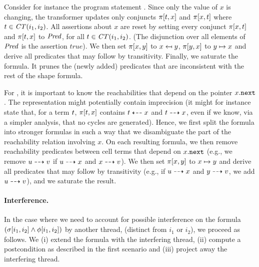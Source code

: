 Consider for instance the program statement {}. %
Since only the value of $x$ is changing, the transformer updates only
conjuncts $\pi[t,x]$ and $\pi[x,t]$ where
$t\in{\it CT}(i_1,i_2)$. %
All assertions about $x$ are reset by setting every conjunct
$\pi[x,t]$ and $\pi[t,x]$ to $\mathit{Pred}$, for all
$t\in{\it CT}(i_1,i_2)$. %
(The disjunction over all elements of $\mathit{Pred}$ is the assertion
$true$). %
We then set $\pi[x,y]$ to $x\mapsfrom y$, $\pi[y,x]$ to
$y\mapsto x$ and derive all predicates that may follow by
transitivity. %
Finally, we saturate the formula. It prunes the (newly added)
predicates that are inconsistent with the rest of the shape formula.

For {}, it is important to know the reachabilities
that depend on the pointer $x{\tt .next}$. %
The representation might potentially contain imprecision %
(it might for instance state that, for a term $t$,
$\pi[t,x]$ contains $t\dashleftarrow x$ and $t\dashrightarrow x$, %
even if we know, via a simpler analysis, that no cycles are generated). %
Hence, we first split the formula into stronger formulas in such a way
that we disambiguate the part of the reachability relation involving
$x$. %
%
On each resulting formula, we then remove reachability predicates
between cell terms that depend on $x{\tt .next}$ %
(e.g., we remove $u\dashrightarrow v$ if $u\dashrightarrow x$ and $x\dashrightarrow v$). %
We then set $\pi[x,y]$ to $x\mapsto y$ and derive all
predicates that may follow by transitivity (e.g., if $u\dashrightarrow x$ and
$y\dashrightarrow v$, we add $u\dashrightarrow v$), and we saturate the result.


\paragraph{Interference.}
In the case where we need to account for possible interference on the
formula \(%
\left( \symbstate[i_1,i_2] \land \shapeconstr[i_1,i_2] \right)%
\) %
by another thread, (distinct from $i_1$ or $i_2$), we proceed as
follows. We %
(i) extend the formula with the interfering thread, %
(ii) compute a postcondition as described in the first scenario %
and (iii) project away the interfering thread. %
%
%

